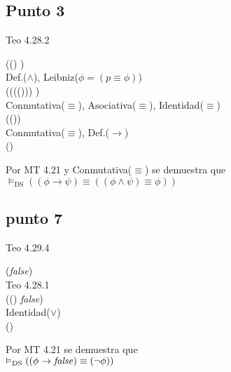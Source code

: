 \documentclass{article}
\begin{document}
\subsection{Punto 3}
\begin{logicenv}{Teo 4.28.2}
    \begin{derivation}
            ((\phi \land \psi) \equiv \phi)\\
        Def.($\land$), Leibniz($\phi = (p \equiv \phi)$)\\
            ((\phi \equiv (\psi \equiv (\phi \lor \psi))) \equiv \phi)\\
        Conmutativa($\equiv$), Asociativa($\equiv$), Identidad($\equiv$)\\
            (\psi \equiv (\phi \lor \psi))\\
        Conmutativa($\equiv$), Def.($\to$)\\
            (\phi \to \psi)
    \end{derivation}
    Por MT 4.21 y Conmutativa($\equiv$) se demuestra que\\
    $\vDash_{\text{DS}} ((\phi \to \psi) \equiv ((\phi \land \psi) \equiv \phi))$
\end{logicenv}

\subsection{punto 7}
\begin{logicenv}{Teo 4.29.4}
    \begin{derivation}
            (\phi \to \textrm{\textit{false}})\\
        Teo 4.28.1\\
            ((\neg \phi) \lor \textrm{\textit{false}})\\
        Identidad($\lor$)\\
            (\neg \phi)
    \end{derivation}
    Por MT 4.21 se demuestra que\\
    $\vDash_{\text{DS}} ((\phi \to \textrm{\textit{false}}) \equiv (\neg \phi))$
\end{logicenv}
\end{document}
